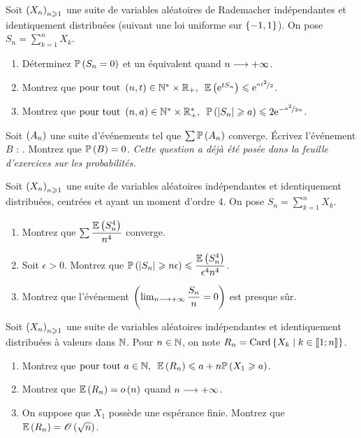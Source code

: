 \begin{exoss}
Soit \(\left(X_n\right)_{n\geqslant1}\) une suite de variables aléatoires de Rademacher indépendantes et identiquement distribuées (\cad suivant une loi uniforme sur \(\left\lbrace-1,1\right\rbrace\)). On pose \(S_n=\sum_{k=1}^nX_k\).

\begin{enumerate}
    \item Déterminez \(\mathbb{P}\left(S_n=0\right)\) et un équivalent quand \(n\longrightarrow+\infty\). \\
    \item Montrez que \(\quantifs{\tpt\paren{n,t}\in\Ns\times\Rp}\esp{\e{tS_n}}\leq\e{\nicefrac{nt^2}{2}}\). \\
    \item Montrez que \(\quantifs{\tpt\paren{n,a}\in\Ns\times\Rps}\proba{\abs{S_n}\geq a}\leq2\e{-\nicefrac{a^2}{2n}}\).
\end{enumerate}
\end{exoss}

\begin{exoss}
Soit \(\left(A_n\right)\) une suite d'événements tel que \(\sum\mathbb{P}\left(A_n\right)\) converge. Écrivez l'événement \(B\) : . Montrez que \(\mathbb{P}\left(B\right)=0\). \textit{Cette question a déjà été posée dans la feuille d'exercices sur les probabilités.}

Soit \(\left(X_n\right)_{n\geqslant1}\) une suite de variables aléatoires indépendantes et identiquement distribuées, centrées et ayant un moment d'ordre \(4\). On pose \(S_n=\sum_{k=1}^nX_k\).

\begin{enumerate}
    \item Montrez que \(\sum\dfrac{\operatorname{\mathbb{E}}\left(S_n^4\right)}{n^4}\) converge. \\
    \item Soit \(\epsilon>0\). Montrez que \(\mathbb{P}\left(\left\lvert S_n\right\rvert\geqslant n\epsilon\right)\leqslant\dfrac{\operatorname{\mathbb{E}}\left(S_n^4\right)}{\epsilon^4n^4}\). \\
    \item Montrez que l'événement \(\left(\lim_{n\longrightarrow+\infty}\dfrac{S_n}{n}=0\right)\) est presque sûr.
\end{enumerate}
\end{exoss}

\begin{exoss}
Soit \(\left(X_n\right)_{n\geqslant1}\) une suite de variables aléatoires indépendantes et identiquement distribuées à valeurs dans \(\mathbb{N}\). Pour \(n\in\mathbb{N}\), on note \(R_n=\operatorname{Card}\left\lbrace X_k\;\middle|\; k\in\left\llbracket1;n\right\rrbracket\right\rbrace\).

\begin{enumerate}
    \item Montrez que \(\quantifs{\tpt a\in\N}\esp{R_n}\leq a+n\proba{X_1\geq a}\). \\
    \item Montrez que \(\operatorname{\mathbb{E}}\left(R_n\right)=o\left(n\right)\) quand \(n\longrightarrow+\infty\). \\
    \item On suppose que \(X_1\) possède une espérance finie. Montrez que \(\operatorname{\mathbb{E}}\left(R_n\right)=\mathscr{O}\left(\sqrt{n}\right)\).
\end{enumerate}
\end{exoss}

